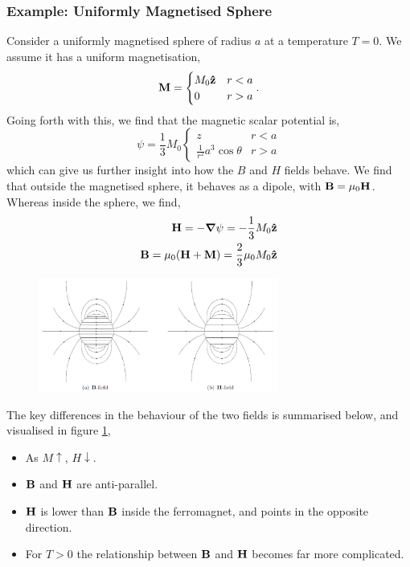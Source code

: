 \documentclass{book}
\begin{document}
\subsubsection{Example: Uniformly Magnetised Sphere}
Consider a uniformly magnetised sphere of radius $a$ at a temperature $T=0$. We assume it has a uniform magnetisation,
\begin{equation}
	\vb{M} = \begin{cases}
		M_0\vu{z} & r < a \\
		0 & r > a
	\end{cases}.
\end{equation}
Going forth with this, we find that the magnetic scalar potential is,
\begin{equation}
	\psi = \frac{1}{3}M_0\begin{cases}
		z & r < a \\
		\frac{1}{r^2}a^3\cos\theta & r>a
	\end{cases}
\end{equation}
which can give us further insight into how the $B$ and $H$ fields behave. We find that outside the magnetised sphere, it behaves as a dipole, with $\vb{B} = \mu_0\vb{H}$. Whereas inside the sphere, we find,
\begin{align}
	\vb{H} = - \grad\psi = -\frac{1}{3}M_0\vu{z} \\
	\vb{B} = \mu_0(\vb{H} + \vb{M}) = \frac{2}{3}\mu_0M_0\vu{z}
\end{align}
\begin{figure}
	\centering
	\includegraphics[width=0.7\textwidth]{B-H.png}
	\caption{}
	\label{fig:bh}
\end{figure}
The key differences in the behaviour of the two fields is summarised below, and visualised in figure \ref{fig:bh},
\begin{itemize}
	\item As $M\uparrow$, $H\downarrow$.
	\item $\vb{B}$ and $\vb{H}$ are anti-parallel.
	\item $\vb{H}$ is lower than $\vb{B}$ inside the ferromagnet, and points in the opposite direction.
	\item For $T>0$ the relationship between $\vb{B}$ and $\vb{H}$ becomes far more complicated.
\end{itemize}
\end{document}
